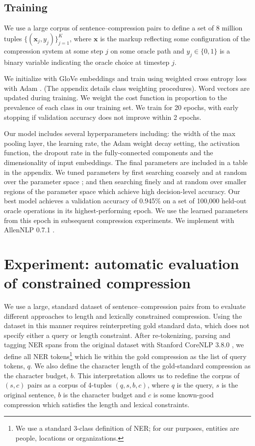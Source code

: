 \documentclass[11pt,a4paper]{article}
\begin{document}
\subsection{Training}

We use a large corpus of sentence--compression pairs \cite{filippova2013overcoming} to define a set of 8 million tuples $\{(\bm{x}_j, y_j) \}_{j=1}^{K}$, where $\bm{x}$ is the markup reflecting some configuration of the compression system at some step $j$ on some oracle path and $y_j \in \{0,1\}$ is a binary variable indicating the oracle choice at timestep $j$.

We initialize with GloVe embeddings \cite{pennington2014glove} and train using weighted cross entropy loss with Adam \cite{Kingma2014AdamAM}. (The appendix details class weighting procedures). Word vectors are updated during training. We weight the cost function in proportion to the prevalence of each class in our training set. We train for 20 epochs, with early stopping if validation accuracy does not improve within 2 epochs.

Our model includes several hyperparameters including: the width of the max pooling layer, the learning rate, the Adam weight decay setting, the activation function, the dropout rate in the fully-connected components and the dimensionality of input embeddings. The final parameters are included in a table in the appendix. We tuned parameters by first searching coarsely and at random over the parameter space \cite{Bergstra2012RandomSF}; and then searching finely and at random over smaller regions of the parameter space which achieve high decision-level accuracy. Our best model achieves a validation accuracy of 0.945\% on a set of 100,000 held-out oracle operations in its highest-performing epoch. We use the learned parameters from this epoch in subsequent compression experiments. We implement with AllenNLP 0.7.1 \cite{Gardner2017AllenNLP}.

\section{Experiment: automatic evaluation of constrained compression}\label{s:autoeval}

We use a large, standard dataset of sentence--compression pairs from \citet{filippova2013overcoming} to evaluate different approaches to length and lexically constrained compression. Using the dataset in this manner requires reinterpreting gold standard data, which does not specify either a query or length constraint. After re-tokenizing, parsing and tagging NER spans from the original dataset with Stanford CoreNLP 3.8.0 \cite{corenlp}, we define all NER tokens\footnote{We use a standard 3-class definition of NER; for our purposes, entities are people, locations or organizations.} which lie within the gold compression as the list of query tokens, $q$. We also define the character length of the gold-standard compression as the character budget, $b$. This interpretation allows us to redefine the corpus of $(s,c)$ pairs as a corpus of 4-tuples $(q,s,b,c)$, where $q$ is the query, $s$ is the original sentence, $b$ is the character budget and $c$ is some known-good compression which satisfies the length and lexical constraints. 
\end{document}
